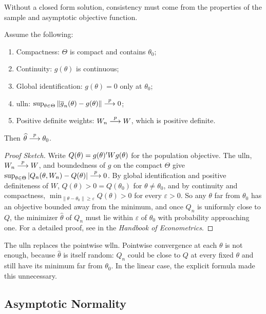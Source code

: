 \documentclass[a4paper,12pt]{article}
\begin{document}
Without a closed form solution, consistency must come from the properties of the sample and asymptotic objective function.

\begin{theorem}[Consistency]\label{thm-consistency}
	Assume the following:
	\begin{enumerate}
		\item Compactness: $\Theta$ is compact and contains $\theta_0$;
		\item Continuity: $g(\theta)$ is continuous;
		\item Global identification: $g(\theta)=0$ only at $\theta_0$;
		\item \gls{ulln}: $\sup_{\theta\in\Theta}\|\overline g_n(\theta)-g(\theta)\|\overset{p}{\longrightarrow}0$;
		\item Positive definite weights: $W_n\overset{p}{\longrightarrow} W$, which is positive definite.
	\end{enumerate}
	Then $\widehat\theta\overset{p}{\longrightarrow}\theta_0$.
\end{theorem}
\begin{proof}[Proof Sketch]
	Write $Q(\theta)=g(\theta)^{\prime} Wg(\theta)$ for the population objective.
	The \gls{ulln}, $W_n\overset{p}{\longrightarrow} W$, and boundedness of $g$ on the compact $\Theta$ give $\sup_{\theta\in\Theta}|Q_n(\theta,W_n)-Q(\theta)|\overset{p}{\longrightarrow}0$.
	By global identification and positive definiteness of $W$, $Q(\theta)>0=Q(\theta_0)$ for $\theta\ne\theta_0$,
	and by continuity and compactness, $\min_{\|\theta-\theta_0\|\ge\varepsilon}Q(\theta)>0$ for every $\varepsilon>0$.
	So any $\theta$ far from $\theta_0$ has an objective bounded away from the minimum,
	and once $Q_n$ is uniformly close to $Q$, the minimizer $\widehat\theta$ of $Q_n$ must lie within $\varepsilon$ of $\theta_0$ with probability approaching one.
	For a detailed proof, see \textcite{newey-mcfadden-1994} in the \emph{Handbook of Econometrics}.
\end{proof}

\begin{remark}
	The \gls{ulln} replaces the pointwise \gls{wlln}.
	Pointwise convergence at each $\theta$ is not enough, because $\widehat\theta$ is itself random:
	$Q_n$ could be close to $Q$ at every fixed $\theta$ and still have its minimum far from $\theta_0$.
	In the linear case, the explicit formula made this unnecessary.
\end{remark}

\subsection{Asymptotic Normality}
\end{document}
